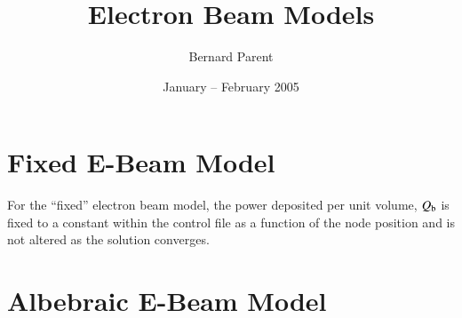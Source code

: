\documentclass{warpdoc}
\author{
  Bernard Parent
}
\title{
 Electron Beam Models
}
\date{
  January -- February 2005
}
\begin{document}
  \pagestyle{headings}
  \setcounter{page}{1}
  \makewarpdoctitle

\section{Fixed E-Beam Model}

For the ``fixed'' electron beam model, the power deposited per unit volume, $Q_{\rm b}$ is fixed to a constant within the control file as a function of the node position and is not altered as the solution converges.


\section{Albebraic E-Beam Model}
\end{document}
